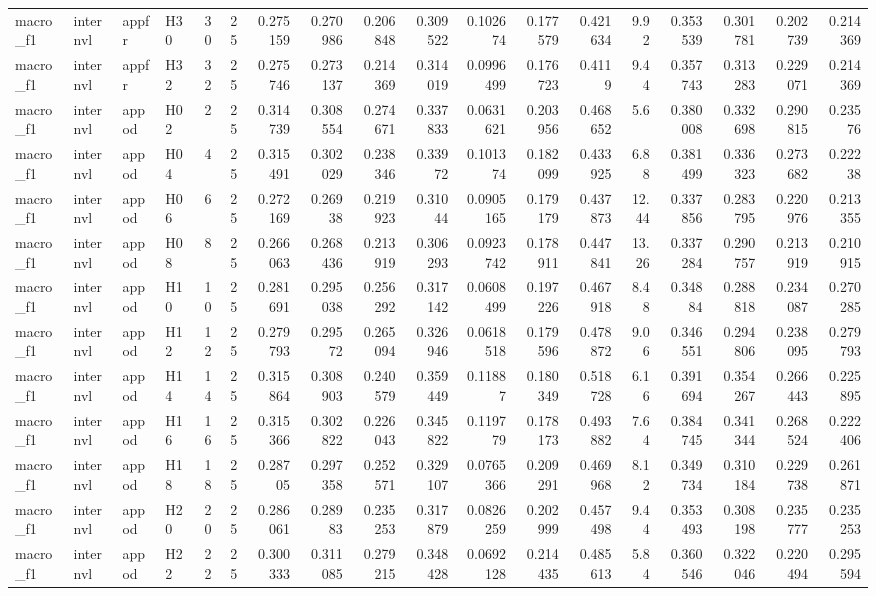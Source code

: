 \begin{longtable}{llllrrrrrrrrrrrrrr}
macro\_f1 & internvl & appfr & H30 & 30 & 25 & 0.275159 & 0.270986 & 0.206848 & 0.309522 & 0.102674 & 0.177579 & 0.421634 & 9.92 & 0.353539 & 0.301781 & 0.202739 & 0.214369 \\
macro\_f1 & internvl & appfr & H32 & 32 & 25 & 0.275746 & 0.273137 & 0.214369 & 0.314019 & 0.0996499 & 0.176723 & 0.4119 & 9.44 & 0.357743 & 0.313283 & 0.229071 & 0.214369 \\
macro\_f1 & internvl & appod & H02 & 2 & 25 & 0.314739 & 0.308554 & 0.274671 & 0.337833 & 0.0631621 & 0.203956 & 0.468652 & 5.6 & 0.380008 & 0.332698 & 0.290815 & 0.23576 \\
macro\_f1 & internvl & appod & H04 & 4 & 25 & 0.315491 & 0.302029 & 0.238346 & 0.33972 & 0.101374 & 0.182099 & 0.433925 & 6.88 & 0.381499 & 0.336323 & 0.273682 & 0.22238 \\
macro\_f1 & internvl & appod & H06 & 6 & 25 & 0.272169 & 0.26938 & 0.219923 & 0.31044 & 0.0905165 & 0.179179 & 0.437873 & 12.44 & 0.337856 & 0.283795 & 0.220976 & 0.213355 \\
macro\_f1 & internvl & appod & H08 & 8 & 25 & 0.266063 & 0.268436 & 0.213919 & 0.306293 & 0.0923742 & 0.178911 & 0.447841 & 13.26 & 0.337284 & 0.290757 & 0.213919 & 0.210915 \\
macro\_f1 & internvl & appod & H10 & 10 & 25 & 0.281691 & 0.295038 & 0.256292 & 0.317142 & 0.0608499 & 0.197226 & 0.467918 & 8.48 & 0.34884 & 0.288818 & 0.234087 & 0.270285 \\
macro\_f1 & internvl & appod & H12 & 12 & 25 & 0.279793 & 0.29572 & 0.265094 & 0.326946 & 0.0618518 & 0.179596 & 0.478872 & 9.06 & 0.346551 & 0.294806 & 0.238095 & 0.279793 \\
macro\_f1 & internvl & appod & H14 & 14 & 25 & 0.315864 & 0.308903 & 0.240579 & 0.359449 & 0.11887 & 0.180349 & 0.518728 & 6.16 & 0.391694 & 0.354267 & 0.266443 & 0.225895 \\
macro\_f1 & internvl & appod & H16 & 16 & 25 & 0.315366 & 0.302822 & 0.226043 & 0.345822 & 0.119779 & 0.178173 & 0.493882 & 7.64 & 0.384745 & 0.341344 & 0.268524 & 0.222406 \\
macro\_f1 & internvl & appod & H18 & 18 & 25 & 0.28705 & 0.297358 & 0.252571 & 0.329107 & 0.0765366 & 0.209291 & 0.469968 & 8.12 & 0.349734 & 0.310184 & 0.229738 & 0.261871 \\
macro\_f1 & internvl & appod & H20 & 20 & 25 & 0.286061 & 0.28983 & 0.235253 & 0.317879 & 0.0826259 & 0.202999 & 0.457498 & 9.44 & 0.353493 & 0.308198 & 0.235777 & 0.235253 \\
macro\_f1 & internvl & appod & H22 & 22 & 25 & 0.300333 & 0.311085 & 0.279215 & 0.348428 & 0.0692128 & 0.214435 & 0.485613 & 5.84 & 0.360546 & 0.322046 & 0.220494 & 0.295594 \\

\end{longtable}
